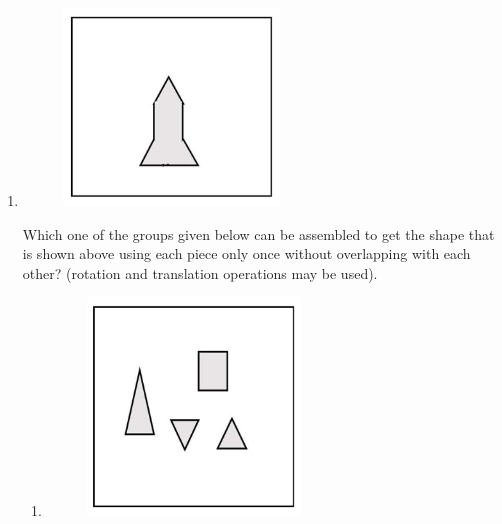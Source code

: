 \documentclass[a4paper, 11pt]{article}
\begin{document}
\begin{enumerate}
\item
\begin{figure}[H]
    \includegraphics[width=\columnwidth]{figs/fig_5.png}
    \label{fig:placeholder}
\end{figure}
Which one of the groups given below can be assembled to get the shape that is shown above using each piece only once without overlapping with each other? (rotation and translation operations may be used).
\begin{enumerate}
    \item \begin{figure}[H]
        \includegraphics[width=\columnwidth]{figs/fig_5.1.png}

\end{figure}
\end{enumerate}
\end{enumerate}
\end{document}
